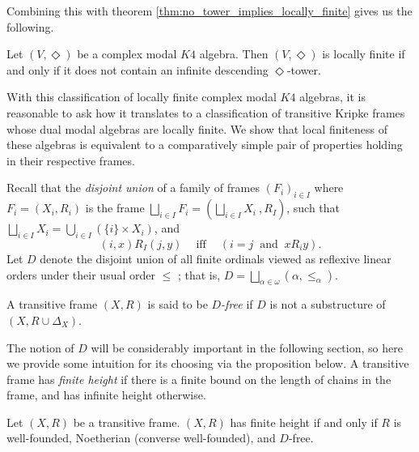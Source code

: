 \documentclass[submission]{eptcs}
\begin{document}
Combining this with theorem \ref{thm:no_tower_implies_locally_finite} gives us the following.

\begin{corollary} \label{coro:classification_of_lfcmk4a}
    Let $(V,\Diamond)$ be a complex modal $K4$ algebra. Then $(V,\Diamond)$ is locally finite if and only if it does not contain an infinite descending $\Diamond$-tower.
\end{corollary}

With this classification of locally finite complex modal $K4$ algebras, it is reasonable to ask how it translates to a classification of transitive Kripke frames whose dual modal algebras are locally finite. We show that local finiteness of these algebras is equivalent to a comparatively simple pair of properties holding in their respective frames.
\par
Recall that the \textit{disjoint union} of a family of frames $(F_i)_{i \in I}$ where $F_i=(X_i,R_i)$ is the frame 
    $\bigsqcup_{i\in I}F_i = \left( \bigsqcup_{i \in I}X_i\ ,R_I \right)$,
    such that 
    $\bigsqcup_{i \in I}X_i = \bigcup_{i \in I} (\{i\} \times X_i)$, and
    \[
    (i,x) R_I (j,y)\ \ \ \ \text{ iff } \ \ \ \ (i=j \ \text{ and }\ xR_i y).
    \]
Let $D$ denote the disjoint union of all finite ordinals viewed as reflexive linear orders under their usual order $\leq$ ; that is, 
$D=\bigsqcup_{\alpha \in \omega} (\alpha, \leq_\alpha)$.
\par
\begin{definition}
    A transitive frame $(X,R)$ is said to be \textit{$D$-free} if $D$ is not a substructure of $(X,R\cup \Delta_X)$.
\end{definition}

The notion of $D$ will be considerably important in the following section, so here we provide some intuition for its choosing via the proposition below.
A transitive frame has \textit{finite height} if there is a finite bound on the length of chains in the frame, and has infinite height otherwise.

\begin{proposition}\label{prop:fin_height}
    Let $(X,R)$ be a transitive frame. $(X,R)$ has finite height if and only if $R$ is well-founded, Noetherian (converse well-founded), and $D$-free.
\end{proposition}
\end{document}
